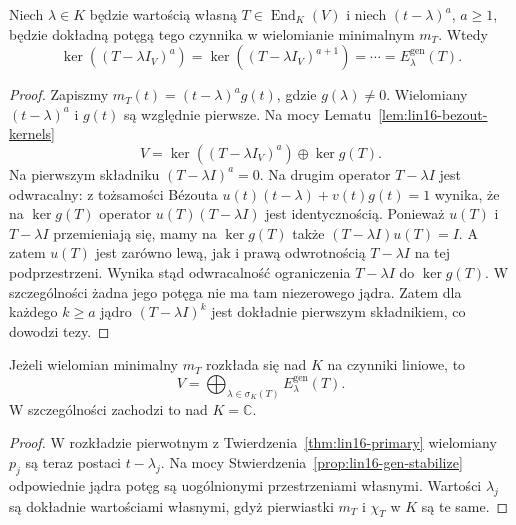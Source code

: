 \begin{stwierdzenie}
\label{prop:lin16-gen-stabilize}
Niech \(\lambda\in K\) będzie wartością własną
\(T\in\operatorname{End}_K(V)\)
i niech \((t-\lambda)^a\), \(a\ge1\),
będzie dokładną potęgą tego czynnika
w wielomianie minimalnym \(m_T\).
Wtedy
\[
 \ker((T-\lambda I_V)^a)
 =\ker((T-\lambda I_V)^{a+1})
 =\cdots
 =E_\lambda^{\mathrm{gen}}(T).
\]
\end{stwierdzenie}
\begin{proof}
Zapiszmy \(m_T(t)=(t-\lambda)^ag(t)\),
gdzie \(g(\lambda)\ne0\).
Wielomiany \((t-\lambda)^a\) i \(g(t)\)
są względnie pierwsze.
Na mocy Lematu~\ref{lem:lin16-bezout-kernels}
\[
 V=\ker((T-\lambda I_V)^a)\oplus\ker g(T).
\]
Na pierwszym składniku \((T-\lambda I)^a=0\).
Na drugim operator \(T-\lambda I\)
jest odwracalny: z tożsamości Bézouta
\(u(t)(t-\lambda)+v(t)g(t)=1\)
wynika, że na \(\ker g(T)\)
operator \(u(T)(T-\lambda I)\) jest identycznością.
Ponieważ \(u(T)\) i \(T-\lambda I\)
przemieniają się, mamy na \(\ker g(T)\)
także \((T-\lambda I)u(T)=I\).
A zatem \(u(T)\) jest zarówno lewą,
jak i prawą odwrotnością \(T-\lambda I\)
na tej podprzestrzeni. Wynika stąd
odwracalność ograniczenia \(T-\lambda I\)
do \(\ker g(T)\).
W szczególności żadna jego potęga
nie ma tam niezerowego jądra.
Zatem dla każdego \(k\ge a\)
jądro \((T-\lambda I)^k\)
jest dokładnie pierwszym składnikiem,
co dowodzi tezy.
\end{proof}

\begin{wniosek}
\label{cor:lin16-generalized}
Jeżeli wielomian minimalny \(m_T\)
rozkłada się nad \(K\) na czynniki liniowe,
to
\[
 V=\bigoplus_{\lambda\in\sigma_K(T)}
                 E_\lambda^{\mathrm{gen}}(T).
\]
W szczególności zachodzi to nad \(K=\mathbb C\).
\end{wniosek}
\begin{proof}
W rozkładzie pierwotnym
z Twierdzenia~\ref{thm:lin16-primary}
wielomiany \(p_j\) są teraz postaci
\(t-\lambda_j\).
Na mocy
Stwierdzenia~\ref{prop:lin16-gen-stabilize}
odpowiednie jądra potęg są
uogólnionymi przestrzeniami własnymi.
Wartości \(\lambda_j\) są dokładnie
wartościami własnymi, gdyż pierwiastki
\(m_T\) i \(\chi_T\) w \(K\) są te same.
\end{proof}

